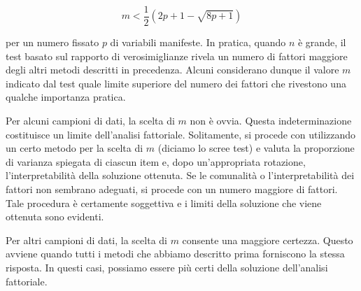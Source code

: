 \documentclass[
  11pt,
]{krantz}
\theoremstyle{definition}
\theoremstyle{definition}
\theoremstyle{definition}
\theoremstyle{definition}
\theoremstyle{remark}
\begin{document}
\[m < \frac{1}{2} \left( 2p+1-\sqrt{8p+1} \right)\]

per un numero fissato \(p\) di variabili manifeste. In pratica, quando \(n\) è grande, il test basato sul rapporto di verosimiglianze rivela un numero di fattori maggiore degli altri metodi descritti in precedenza. Alcuni considerano dunque il valore \(m\) indicato dal test quale limite superiore del numero dei fattori che rivestono una qualche importanza pratica.

Per alcuni campioni di dati, la scelta di \(m\) non è ovvia. Questa indeterminazione costituisce un limite dell'analisi fattoriale. Solitamente, si procede con utilizzando un certo metodo per la scelta di \(m\) (diciamo lo scree test) e valuta la proporzione di varianza spiegata di ciascun item e, dopo un'appropriata rotazione, l'interpretabilità della soluzione ottenuta. Se le comunalità o l'interpretabilità dei fattori non sembrano adeguati, si procede con un numero maggiore di fattori. Tale procedura è certamente soggettiva e i limiti della soluzione che viene ottenuta sono evidenti.

Per altri campioni di dati, la scelta di \(m\) consente una maggiore certezza. Questo avviene quando tutti i metodi che abbiamo descritto prima forniscono la stessa risposta. In questi casi, possiamo essere più certi della soluzione dell'analisi fattoriale.
\end{document}

